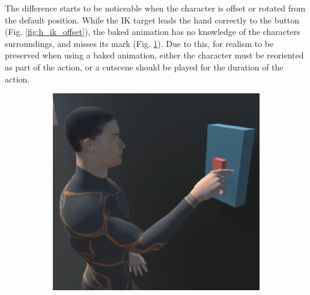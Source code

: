 The difference starts to be noticeable when the character is offset or rotated
from the default position. While the IK target leads the hand correctly to the
button (Fig. \ref{fig:h_ik_offset}), the baked animation has no knowledge of
the characters surroundings, and misses its mark (Fig. \ref{fig:h_b_offset}).
Due to this, for realism to be preserved when using a baked animation, either
the character must be reoriented as part of the action, or a cutscene should be
played for the duration of the action. 

\begin{figure}[h!]
    \centering
    \captionsetup{justification=centering}
    \begin{subfigure}{0.4\textwidth}
        \includegraphics[width=\linewidth]{grafika/h_b_offset.eps}
        \label{fig:h_b_offset}
    \end{subfigure}
    \begin{subfigure}{0.4\textwidth}

\end{subfigure}
\end{figure}
